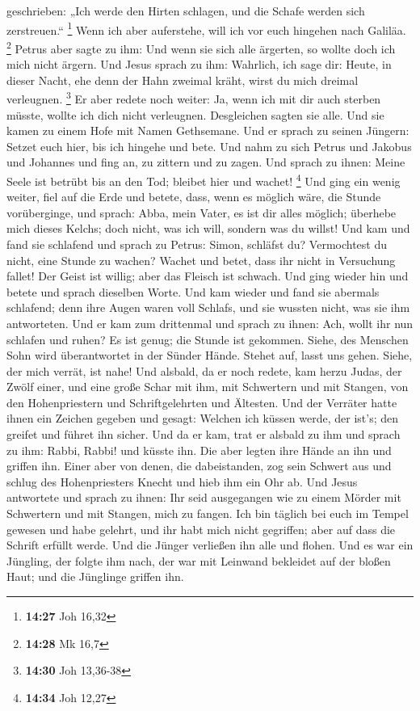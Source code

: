 geschrieben: „Ich werde den Hirten schlagen, und die Schafe werden sich
zerstreuen.`` \footnote{\textbf{14:27} Joh 16,32}  Wenn
ich aber auferstehe, will ich vor euch hingehen nach Galiläa.
\footnote{\textbf{14:28} Mk 16,7}  Petrus aber sagte zu
ihm: Und wenn sie sich alle ärgerten, so wollte doch ich mich nicht
ärgern.  Und Jesus sprach zu ihm: Wahrlich, ich sage dir:
Heute, in dieser Nacht, ehe denn der Hahn zweimal kräht, wirst du mich
dreimal verleugnen. \footnote{\textbf{14:30} Joh 13,36-38}
 Er aber redete noch weiter: Ja, wenn ich mit dir auch
sterben müsste, wollte ich dich nicht verleugnen. Desgleichen sagten sie
alle.  Und sie kamen zu einem Hofe mit Namen Gethsemane.
Und er sprach zu seinen Jüngern: Setzet euch hier, bis ich hingehe und
bete.  Und nahm zu sich Petrus und Jakobus und Johannes
und fing an, zu zittern und zu zagen.  Und sprach zu
ihnen: Meine Seele ist betrübt bis an den Tod; bleibet hier und wachet!
\footnote{\textbf{14:34} Joh 12,27}  Und ging ein wenig
weiter, fiel auf die Erde und betete, dass, wenn es möglich wäre, die
Stunde vorüberginge,  und sprach: Abba, mein Vater, es
ist dir alles möglich; überhebe mich dieses Kelchs; doch nicht, was ich
will, sondern was du willst!  Und kam und fand sie
schlafend und sprach zu Petrus: Simon, schläfst du? Vermochtest du
nicht, eine Stunde zu wachen?  Wachet und betet, dass ihr
nicht in Versuchung fallet! Der Geist ist willig; aber das Fleisch ist
schwach.  Und ging wieder hin und betete und sprach
dieselben Worte.  Und kam wieder und fand sie abermals
schlafend; denn ihre Augen waren voll Schlafs, und sie wussten nicht,
was sie ihm antworteten.  Und er kam zum drittenmal und
sprach zu ihnen: Ach, wollt ihr nun schlafen und ruhen? Es ist genug;
die Stunde ist gekommen. Siehe, des Menschen Sohn wird überantwortet in
der Sünder Hände.  Stehet auf, lasst uns gehen. Siehe,
der mich verrät, ist nahe!  Und alsbald, da er noch
redete, kam herzu Judas, der Zwölf einer, und eine große Schar mit ihm,
mit Schwertern und mit Stangen, von den Hohenpriestern und
Schriftgelehrten und Ältesten.  Und der Verräter hatte
ihnen ein Zeichen gegeben und gesagt: Welchen ich küssen werde, der
ist's; den greifet und führet ihn sicher.  Und da er kam,
trat er alsbald zu ihm und sprach zu ihm: Rabbi, Rabbi! und küsste ihn.
 Die aber legten ihre Hände an ihn und griffen ihn.
 Einer aber von denen, die dabeistanden, zog sein Schwert
aus und schlug des Hohenpriesters Knecht und hieb ihm ein Ohr ab.
 Und Jesus antwortete und sprach zu ihnen: Ihr seid
ausgegangen wie zu einem Mörder mit Schwertern und mit Stangen, mich zu
fangen.  Ich bin täglich bei euch im Tempel gewesen und
habe gelehrt, und ihr habt mich nicht gegriffen; aber auf dass die
Schrift erfüllt werde.  Und die Jünger verließen ihn alle
und flohen.  Und es war ein Jüngling, der folgte ihm
nach, der war mit Leinwand bekleidet auf der bloßen Haut; und die
Jünglinge griffen ihn.

